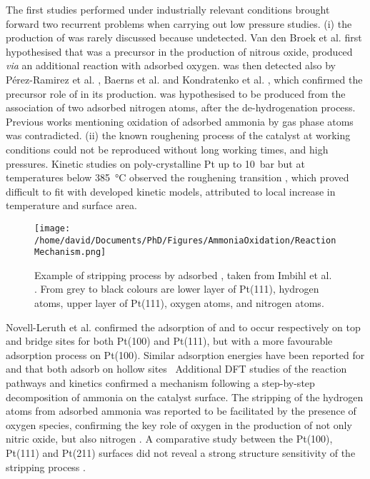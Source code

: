 The first studies performed under industrially relevant conditions brought forward two recurrent problems when carrying out low pressure studies.
(i) the production of  was rarely discussed because undetected.
Van den Broek et al. \parencite*{vandenBroek1999} first hypothesised that  was a precursor in the production of nitrous oxide, produced \textit{via} an additional reaction with adsorbed oxygen.
 was then detected also by Pérez-Ramirez et al. \parencite*{PerezRamirez2004}, Baerns et al. \parencite*{Baerns2005} and Kondratenko et al. \parencite*{Kondratenko2007}, which confirmed the precursor role of  in its production.
 was hypothesised to be produced from the association of two adsorbed nitrogen atoms, after the de-hydrogenation process.
Previous works mentioning oxidation of adsorbed ammonia by gas phase atoms was contradicted.
(ii) the known roughening process of the catalyst at working conditions could not be reproduced without long working times, and high pressures.
Kinetic studies on poly-crystalline Pt up to \qty{10}{\bar} but at temperatures below \qty{385}{\degreeCelsius} observed the roughening transition \parencite{Kraehnert2008}, which proved difficult to fit with developed kinetic models, attributed to local increase in temperature and surface area.

\begin{figure}[!htb]
    \centering
    \texttt{[image: /home/david/Documents/PhD/Figures/AmmoniaOxidation/ReactionMechanism.png]}
    \caption{
    Example of  stripping process by adsorbed , taken from Imbihl et al. \parencite*{Imbihl2007}.
    From grey to black colours are lower layer of Pt(111), hydrogen atoms, upper layer of Pt(111), oxygen atoms, and nitrogen atoms.
    }
    \label{fig:ReactionMechanism}
\end{figure}

Novell-Leruth et al. \parencite*{NovellLeruth2005} confirmed the adsorption of  and  to occur respectively on top and bridge sites for both Pt(100) and Pt(111), but with a more favourable adsorption process on Pt(100).
Similar adsorption energies have been reported for  and  that both adsorb on hollow sites \
Additional DFT studies of the reaction pathways and kinetics confirmed a mechanism following a step-by-step decomposition of ammonia on the catalyst surface.
The stripping of the hydrogen atoms from adsorbed ammonia was reported to be facilitated by the presence of oxygen species, confirming the key role of oxygen in the production of not only nitric oxide, but also nitrogen \parencite{Offermans2006}.
A comparative study between the Pt(100), Pt(111) and Pt(211) surfaces did not reveal a strong structure sensitivity of the \ce{NH_3} stripping process \parencite{Offermans2007}.

